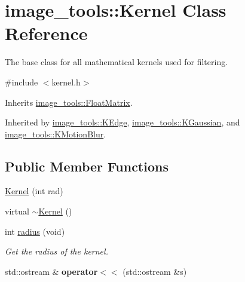 \hypertarget{classimage__tools_1_1Kernel}{}\section{image\+\_\+tools\+:\+:Kernel Class Reference}
\label{classimage__tools_1_1Kernel}


The base class for all mathematical kernels used for filtering.  




{\ttfamily \#include $<$kernel.\+h$>$}



Inherits \hyperlink{classimage__tools_1_1FloatMatrix}{image\+\_\+tools\+::\+Float\+Matrix}.



Inherited by \hyperlink{classimage__tools_1_1KEdge}{image\+\_\+tools\+::\+K\+Edge}, \hyperlink{classimage__tools_1_1KGaussian}{image\+\_\+tools\+::\+K\+Gaussian}, and \hyperlink{classimage__tools_1_1KMotionBlur}{image\+\_\+tools\+::\+K\+Motion\+Blur}.

\subsection*{Public Member Functions}
\begin{DoxyCompactItemize}
\item 
\hyperlink{classimage__tools_1_1Kernel_ac25b0cb8f8e9398d7d628f3bda16b5c9}{Kernel} (int rad)
\item 
virtual \hyperlink{classimage__tools_1_1Kernel_a1f9f0178ad699448ee7c3febd505fb94}{$\sim$\+Kernel} ()
\item 
int \hyperlink{classimage__tools_1_1Kernel_ac834d16a242dd4a15f5f5e4a6dacea01}{radius} (void)\hypertarget{classimage__tools_1_1Kernel_ac834d16a242dd4a15f5f5e4a6dacea01}{}\label{classimage__tools_1_1Kernel_ac834d16a242dd4a15f5f5e4a6dacea01}

\begin{DoxyCompactList}\small\item\em Get the radius of the kernel. \end{DoxyCompactList}\item 
std\+::ostream \& {\bfseries operator$<$$<$} (std\+::ostream \&s)\hypertarget{classimage__tools_1_1Kernel_a46730d0d219b8a1abbbbb849b58a55a9}{}\label{classimage__tools_1_1Kernel_a46730d0d219b8a1abbbbb849b58a55a9}

\end{DoxyCompactItemize}
